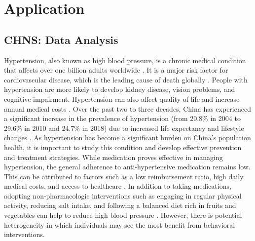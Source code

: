 \documentclass{article}
\begin{document}

\section{Application}\label{sec:appli}
\subsection{CHNS: Data Analysis}

Hypertension, also known as high blood pressure, is a chronic medical condition that affects over one billion adults worldwide \citep{bloch2016worldwide}. It is a major risk factor for cardiovascular disease, which is the leading cause of death globally \citep{bromfield2013high}. People with hypertension are more likely to develop kidney disease, \citep{weldegiorgis2020ckd} vision problems, \citep{bhargava2012eye} and cognitive impairment. \citep{kilander1998htn} Hypertension can also affect quality of life and increase annual medical costs \citep{wang2017annual}. Over the past two to three decades, China has experienced a significant increase in the prevalence of hypertension (from 20.8\% in 2004 to 29.6\% in 2010 and 24.7\% in 2018) due to increased life expectancy and lifestyle changes \citep{zhang2023prevalence, wang2023hypertension}. As hypertension has become a significant burden on China’s population health, it is important to study this condition and develop effective prevention and treatment strategies. 
While medication proves effective in managing hypertension, the general adherence to anti-hypertensive medication remains low. This can be attributed to factors such as a low reimbursement ratio, high daily medical costs, and access to healthcare \cite{cui2020analysis}. In addition to taking medications, adopting non-pharmacologic interventions such as engaging in regular physical activity, reducing salt intake, and following a balanced diet rich in fruits and vegetables can help to reduce high blood pressure \citep{appel2003lifestyle}. However, there is potential heterogeneity in which individuals may see the most benefit from behavioral interventions.  
\end{document}

